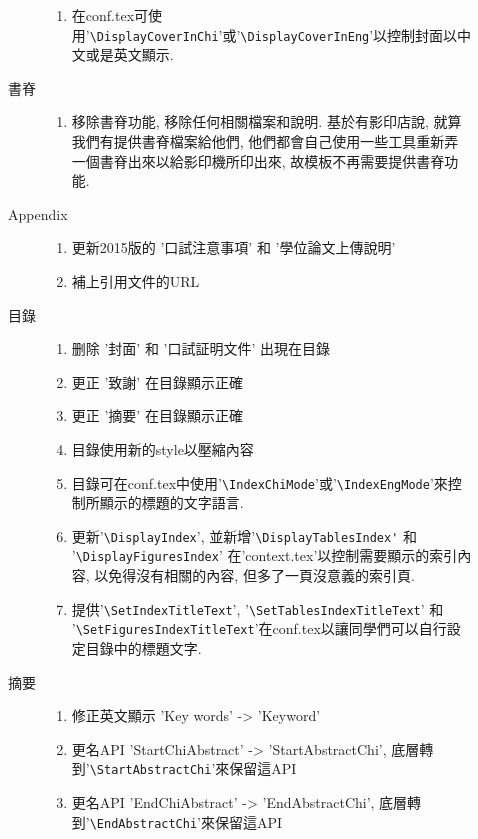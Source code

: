 \begin{description}
\begin{description}
\begin{enumerate}
          \item 在conf.tex可使用'\verb|\DisplayCoverInChi|'或'\verb|\DisplayCoverInEng|'以控制封面以中文或是英文顯示.
        \end{enumerate}
      \item[書脊] \hfill
        \begin{enumerate}
          \item 移除書脊功能, 移除任何相關檔案和說明. 基於有影印店說, 就算我們有提供書脊檔案給他們, 他們都會自己使用一些工具重新弄一個書脊出來以給影印機所印出來, 故模板不再需要提供書脊功能.
        \end{enumerate}
      \item[Appendix] \hfill
        \begin{enumerate}
          \item 更新2015版的 '口試注意事項' 和 '學位論文上傳說明'
          \item 補上引用文件的URL
        \end{enumerate}
      \item[目錄] \hfill
        \begin{enumerate}
          \item 删除 '封面' 和 '口試証明文件' 出現在目錄
          \item 更正 '致謝' 在目錄顯示正確
          \item 更正 '摘要' 在目錄顯示正確
          \item 目錄使用新的style以壓縮內容
          \item 目錄可在conf.tex中使用'\verb|\IndexChiMode|'或'\verb|\IndexEngMode|'來控制所顯示的標題的文字語言.
          \item 更新'\verb|\DisplayIndex|', 並新增'\verb|\DisplayTablesIndex'| 和 '\verb|\DisplayFiguresIndex|' 在'context.tex'以控制需要顯示的索引內容, 以免得沒有相關的內容, 但多了一頁沒意義的索引頁.
          \item 提供'\verb|\SetIndexTitleText|', '\verb|\SetTablesIndexTitleText|' 和 '\verb|\SetFiguresIndexTitleText|'在conf.tex以讓同學們可以自行設定目錄中的標題文字.
        \end{enumerate}
      \item[摘要] \hfill
        \begin{enumerate}
          \item 修正英文顯示 'Key words' -> 'Keyword'
          \item 更名API 'StartChiAbstract' -> 'StartAbstractChi', 底層轉到'\verb|\StartAbstractChi|'來保留這API
          \item 更名API 'EndChiAbstract' -> 'EndAbstractChi', 底層轉到'\verb|\EndAbstractChi|'來保留這API

\end{enumerate}
\end{description}
\end{description}
